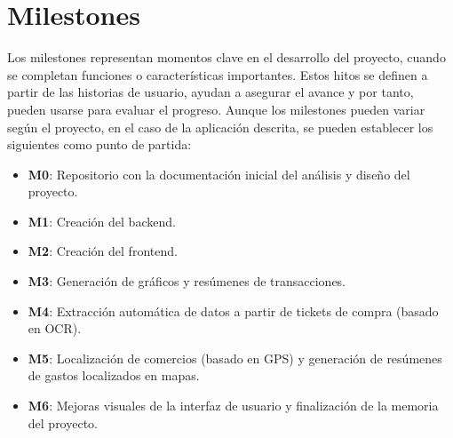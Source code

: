 \begin{itemize}
\end{itemize}

\section{Milestones}\label{sec:milestones}    
Los milestones representan momentos clave en el desarrollo del proyecto, cuando se completan funciones o características importantes. Estos hitos se definen a partir de las historias de usuario, ayudan a asegurar el avance y por tanto, pueden usarse para evaluar el progreso. Aunque los milestones pueden variar según el proyecto, en el caso de la aplicación descrita, se pueden establecer los siguientes como punto de partida:

\begin{itemize}
    \item \textbf{M0}: Repositorio con la documentación inicial del análisis y diseño del proyecto.
    \item \textbf{M1}: Creación del backend.
    \item \textbf{M2}: Creación del frontend.
    \item \textbf{M3}: Generación de gráficos y resúmenes de transacciones.
    \item \textbf{M4}: Extracción automática de datos a partir de tickets de compra (basado en OCR).
    \item \textbf{M5}: Localización de comercios (basado en GPS) y generación de resúmenes de gastos localizados en mapas.
    \item \textbf{M6}: Mejoras visuales de la interfaz de usuario y finalización de la memoria del proyecto.
\end{itemize}